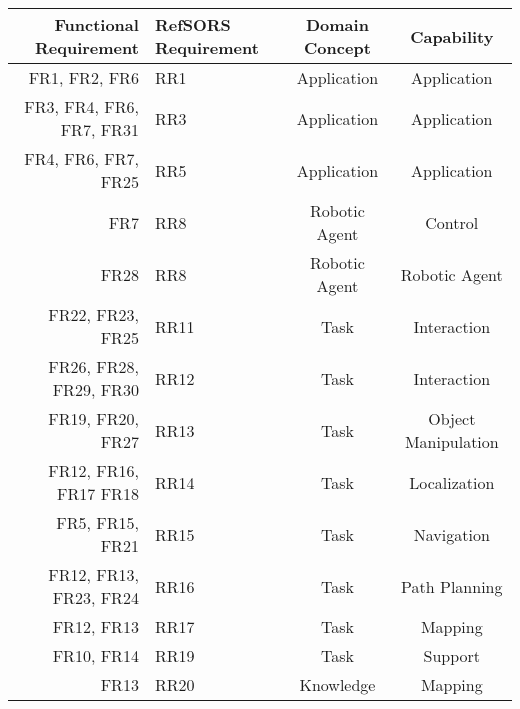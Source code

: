 {
\centering
\begin{tabular}{| r | p{2cm} | c | c |}
	\hline
	Functional Requirement & RefSORS Requirement & Domain Concept & Capability \\ 
	\hline
	FR1, FR2, FR6 & RR1 & Application & Application \\
	FR3, FR4, FR6, FR7, FR31 & RR3 & Application & Application\\
	FR4, FR6, FR7, FR25 & RR5 & Application & Application\\
	\hline
	FR7 & RR8 & Robotic Agent & Control \\%
	FR28 & RR8 & Robotic Agent & Robotic Agent \\%
	\hline
	FR22, FR23, FR25 & RR11 & Task & Interaction \\
	FR26, FR28, FR29, FR30 & RR12 & Task & Interaction \\
	FR19, FR20, FR27 & RR13 & Task & Object Manipulation\\
	FR12, FR16, FR17 FR18 & RR14 & Task & Localization\\
	FR5, FR15, FR21 & RR15 & Task & Navigation\\
	FR12, FR13, FR23, FR24 & RR16 & Task & Path Planning\\
	FR12, FR13 & RR17 & Task & Mapping \\
	FR10, FR14 & RR19 & Task & Support \\ %
	\hline
	FR13 & RR20 & Knowledge &Mapping \\

\end{tabular}}
